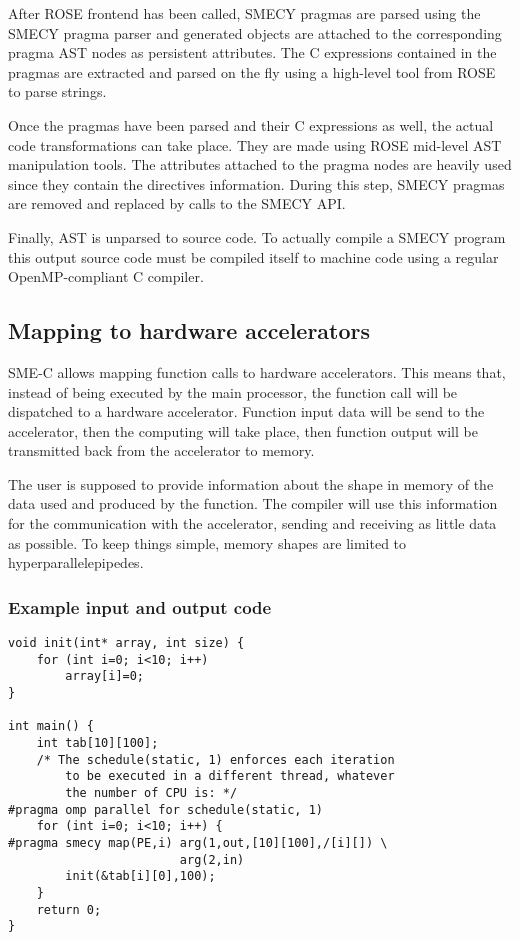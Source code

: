 \documentclass[a4paper]{article}
\begin{document}
	After ROSE frontend has been called, SMECY pragmas are parsed using the SMECY pragma parser and generated objects are attached to the corresponding pragma AST nodes as persistent attributes. The C expressions contained in the pragmas are extracted and parsed on the fly using a high-level tool from ROSE to parse strings.
	
	Once the pragmas have been parsed and their C expressions as well, the actual code transformations can take place. They are made using ROSE mid-level AST manipulation tools. The attributes attached to the pragma nodes are heavily used since they contain the directives information. During this step, SMECY pragmas are removed and replaced by calls to the SMECY API.
	
	Finally, AST is unparsed to source code. To actually compile a SMECY program this output source code must be compiled itself to machine code using a regular OpenMP-compliant C compiler.
	
	
	\subsection{Mapping to hardware accelerators}
	SME-C allows mapping function calls to hardware accelerators. This means that, instead of being executed by the main processor, the function call will be dispatched to a hardware accelerator. Function input data will be send to the accelerator, then the computing will take place, then function output will be transmitted back from the accelerator to memory.
	
	The user is supposed to provide information about the shape in memory of the data used and produced by the function. The compiler will use this information for the communication with the accelerator, sending and receiving as little data as possible. To keep things simple, memory shapes are limited to hyperparallelepipedes.
	
	\subsubsection{Example input and output code}
	
	\begin{lstlisting}[label=mapinput,caption={Input code with hardware mapping pragma.}]
void init(int* array, int size) {
	for (int i=0; i<10; i++)
		array[i]=0;
}

int main() {
	int tab[10][100];
    /* The schedule(static, 1) enforces each iteration
        to be executed in a different thread, whatever
        the number of CPU is: */
#pragma omp parallel for schedule(static, 1)
	for (int i=0; i<10; i++) {
#pragma smecy map(PE,i) arg(1,out,[10][100],/[i][]) \
                        arg(2,in)
		init(&tab[i][0],100);
	}
	return 0;
}
	\end{lstlisting}
	
\end{document}
